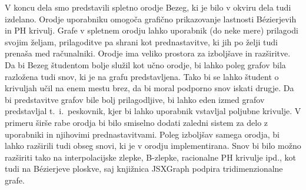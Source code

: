 \documentclass[isrm2, tisk]{fmfdelo}
\begin{document}
    V koncu dela smo predstavili spletno orodje Bezeg, ki je bilo v okviru dela tudi izdelano.
    Orodje uporabniku omogoča grafično prikazovanje lastnosti Bézierjevih in PH krivulj.
    Grafe v spletnem orodju lahko uporabnik (do neke mere) prilagodi svojim željam, prilagoditve pa shrani kot prednastavitve, ki jih po želji tudi prenaša med računalniki.
    Orodje ima veliko prostora za izboljšave in razširitve.
    Da bi Bezeg študentom bolje služil kot učno orodje, bi lahko poleg grafov bila razložena tudi snov, ki je na grafu predstavljena.
    Tako bi se lahko študent o krivuljah učil na enem mestu brez, da bi moral podporno snov iskati drugje.
    Da bi predstavitve grafov bile bolj prilagodljive, bi lahko eden izmed grafov predstavljal t.\ i.\ peskovnik, kjer bi lahko uporabnik vstavljal poljubne krivulje.
    V primeru širše rabe orodja bi bilo smiselno dodati zaledni sistem za delo z uporabniki in njihovimi prednastavitvami.
    Poleg izboljšav samega orodja, bi lahko razširili tudi obseg snovi, ki je v orodju implementirana.
    Snov bi bilo možno razširiti tako na interpolacijske zlepke, B-zlepke, racionalne PH krivulje ipd., kot tudi na Bézierjeve ploskve, saj knjižnica JSXGraph podpira tridimenzionalne grafe.


%
%
%
%
\end{document}
